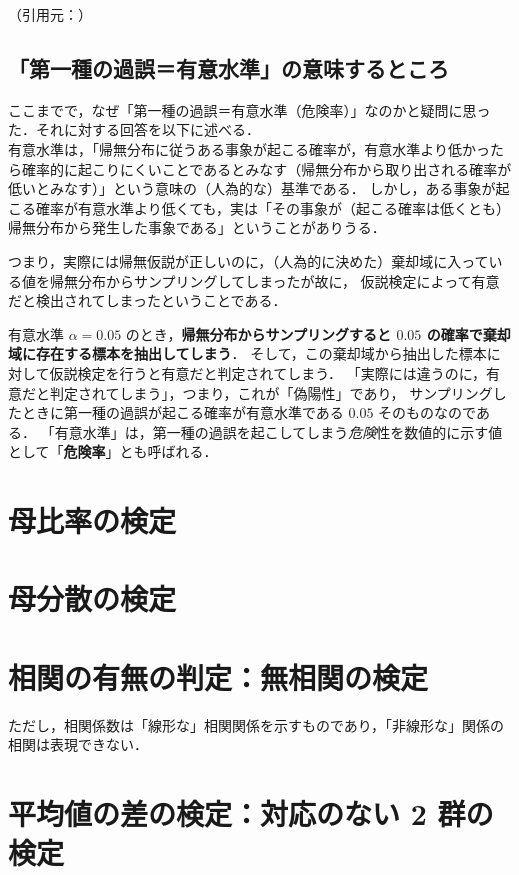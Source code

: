 （引用元：）\\

\newpage

\subsection{「第一種の過誤＝有意水準」の意味するところ}

ここまでで，なぜ「第一種の過誤＝有意水準（危険率）」なのかと疑問に思った．それに対する回答を以下に述べる．\\

有意水準は，「帰無分布に従うある事象が起こる確率が，有意水準より低かったら確率的に起こりにくいことであるとみなす（帰無分布から取り出される確率が低いとみなす）」という意味の（人為的な）基準である．
しかし，ある事象が起こる確率が有意水準より低くても，実は「その事象が（起こる確率は低くとも）帰無分布から発生した事象である」ということがありうる．

つまり，実際には帰無仮説が正しいのに，（人為的に決めた）棄却域に入っている値を帰無分布からサンプリングしてしまったが故に，
仮説検定によって有意だと検出されてしまったということである．

有意水準 $\alpha = 0.05$ のとき，\textbf{帰無分布からサンプリングすると $0.05$ の確率で棄却域に存在する標本を抽出してしまう}．
そして，この棄却域から抽出した標本に対して仮説検定を行うと有意だと判定されてしまう．
「実際には違うのに，有意だと判定されてしまう」，つまり，これが「偽陽性」であり，
サンプリングしたときに第一種の過誤が起こる確率が有意水準である $0.05$ そのものなのである．
「有意水準」は，第一種の過誤を起こしてしまう\emph{危険}性を数値的に示す値として「\textbf{危険率}」とも呼ばれる．

\section{母比率の検定}
\section{母分散の検定}
\section{相関の有無の判定：無相関の検定}

ただし，相関係数は「線形な」相関関係を示すものであり，「非線形な」関係の相関は表現できない．

\section{平均値の差の検定：対応のない 2 群の検定}

